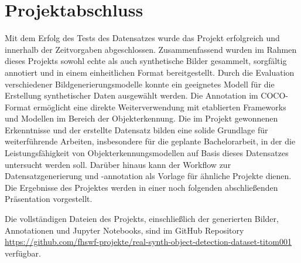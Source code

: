 \section{Projektabschluss}
Mit dem Erfolg des Tests des Datensatzes wurde das Projekt erfolgreich und innerhalb der Zeitvorgaben abgeschlossen. 
Zusammenfassend wurden im Rahmen dieses Projekts sowohl echte als auch synthetische Bilder gesammelt, sorgfältig annotiert und in einem einheitlichen Format bereitgestellt. Durch die Evaluation verschiedener Bildgenerierungsmodelle konnte ein geeignetes Modell für die Erstellung synthetischer Daten ausgewählt werden. Die Annotation im COCO-Format ermöglicht eine direkte Weiterverwendung mit etablierten Frameworks und Modellen im Bereich der Objekterkennung.
Die im Projekt gewonnenen Erkenntnisse und der erstellte Datensatz bilden eine solide Grundlage für weiterführende Arbeiten, insbesondere für die geplante Bachelorarbeit, in der die Leistungsfähigkeit von Objekterkennungsmodellen auf Basis dieses Datensatzes untersucht werden soll. Darüber hinaus kann der Workflow zur Datensatzgenerierung und -annotation als Vorlage für ähnliche Projekte dienen.
Die Ergebnisse des Projektes werden in einer noch folgenden abschließenden Präsentation vorgestellt.

Die vollständigen Dateien des Projekts, einschließlich der generierten Bilder, Annotationen und Jupyter Notebooks, sind im GitHub Repository \url{https://github.com/fhswf-projekte/real-synth-object-detection-dataset-titom001} verfügbar.
